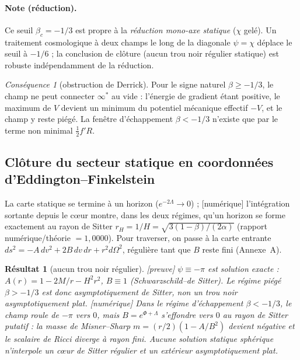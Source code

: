 \documentclass[11pt,a4paper]{article}
\newcommand{\statut}[1]{{\footnotesize\textsf{[#1]}}}
\theoremstyle{plain}
\newtheorem{resultat}{R\'esultat}
\theoremstyle{remark}
\newtheorem*{consequence}{Cons\'equence}
\begin{document}
\footnotetext{} %
\paragraph{Note (r\'eduction).} Ce seuil $\beta_c=-1/3$ est propre \`a la \emph{r\'eduction
mono-axe statique} ($\chi$ gel\'e). Un traitement cosmologique \`a deux champs le long de
la diagonale $\psi=\chi$ d\'eplace le seuil \`a $-1/6$ ; la conclusion de cl\^oture
(aucun trou noir r\'egulier statique) est robuste ind\'ependamment de la r\'eduction.

\begin{consequence}[obstruction de Derrick]
Pour le signe naturel $\beta\ge-1/3$, le champ ne peut connecter $\infty^*$ au vide :
l'\'energie de gradient \'etant positive, le maximum de $V$ devient un minimum du potentiel
m\'ecanique effectif $-V$, et le champ y reste pi\'eg\'e. La fen\^etre d'\'echappement
$\beta<-1/3$ n'existe que par le terme non minimal $\tfrac12 f'R$.
\end{consequence}

\subsection{Cl\^oture du secteur statique en coordonn\'ees d'Eddington--Finkelstein}
La carte statique se termine \`a un horizon ($e^{-2\Lambda}\to0$) ; \statut{num\'erique}
l'int\'egration sortante depuis le c\oe ur montre, dans les deux r\'egimes, qu'un horizon se
forme exactement au rayon de Sitter $r_H=1/H=\sqrt{3(1-\beta)/(2\alpha)}$ (rapport
num\'erique/th\'eorie $=1{,}0000$). Pour traverser, on passe \`a la carte entrante
$ds^2=-A\,dv^2+2B\,dv\,dr+r^2d\Omega^2$, r\'eguli\`ere tant que $B$ reste fini (Annexe~A).

\begin{resultat}[aucun trou noir r\'egulier]\label{res:closure}
\statut{preuve} $\psi\equiv-\pi$ est solution exacte : $A(r)=1-2M/r-H^2r^2$, $B\equiv1$
(Schwarzschild--de Sitter). Le r\'egime pi\'eg\'e $\beta>-1/3$ est donc asymptotiquement de
Sitter, non un trou noir asymptotiquement plat. \statut{num\'erique} Dans le r\'egime
d'\'echappement $\beta<-1/3$, le champ roule de $-\pi$ vers $0$, mais $B=e^{\Phi+\Lambda}$
s'effondre vers $0$ au rayon de Sitter putatif : la masse de Misner--Sharp
$m=(r/2)(1-A/B^2)$ devient n\'egative et le scalaire de Ricci diverge \`a rayon fini.
Aucune solution statique sph\'erique n'interpole un c\oe ur de Sitter r\'egulier et un
ext\'erieur asymptotiquement plat.
\end{resultat}
\end{document}
